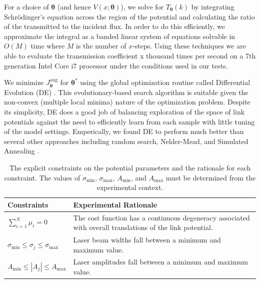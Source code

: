 \documentclass[twocolumn,amsmath,amssymb,showpacs,prl,superscriptaddress,aps]{revtex4-1}
\begin{document}
For a choice of $\bm{\theta}$ (and hence $V(x;\bm{\theta})$), we solve for $T_{\bm{\theta}}(k)$ by integrating Schr{\"o}dinger's equation across the region of the potential and calculating the ratio of the transmitted to the incident flux. In order to do this efficiently, we approximate the integral as a banded linear system of equations solvable in $O(M)$ time where $M$ is the number of $x$-steps. Using these techniques we are able to evaluate the transmission coefficient x thousand times per second on a 7th generation Intel Core i7 processor under the conditions used in our tests. 

 We minimize $J_{\bm{\theta}}^{\mathrm{aug}}$ for $\bm{\theta}^*$ using the global optimization routine called Differential Evolution (DE) \cite{original DE paper}. This evolutionary-based search algorithm is suitable given the non-convex (multiple local minima) nature of the optimization problem. Despite its simplicity, DE does a good job of balancing exploration of the space of link potentials against the need to efficiently learn from each sample with little tuning of the model settings. Emperically, we found DE to perform much better than several other approaches including random search, Nelder-Mead, and Simulated Annealing \cite{Tests performed using mathematica}.

\begin{table}[t]
  \renewcommand*{\arraystretch}{1.4}
  \begin{tabular}{m{3cm}|m{5.5cm}}
    Constraints & Experimental Rationale \\
    \hline\hline
    $\sum_{i=1}^{N}\mu_i = 0$ & The cost function has a continuous degeneracy associated with overall translations of the link potential. \\
    \hline
    $\sigma_{\mathrm{min}} \leq \sigma_j \leq \sigma_{\mathrm{max}} $ & Laser beam widths fall between a minimum and maximum value.\\
    \hline
    $A_{\mathrm{min}} \leq |A_j| \leq A_{\mathrm{max}}$ & Laser amplitudes fall between a minimum and maximum value.
  \end{tabular}
  \caption{The explicit constraints on the potential parameters and the rationale for each constraint. The values of $\sigma_{\mathrm{min}}$, $\sigma_{\mathrm{max}}$, $A_{\mathrm{min}}$, and $A_{\mathrm{max}}$ must be determined from the experimental context.}
  \label{tab:constraints}
\end{table}
\end{document}

